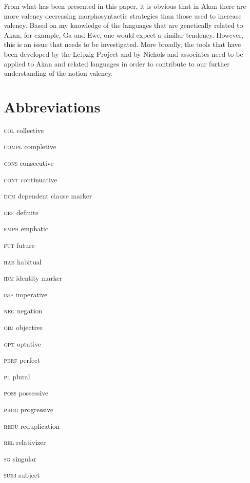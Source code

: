 \documentclass[output=paper]{langsci/langscibook}
\begin{document}
From what has been presented in this paper, it is obvious that in Akan there are more valency decreasing morphosyntactic strategies than those used to increase valency. Based on my knowledge of the languages that are genetically related to Akan, for example, Ga and Ewe, one would expect a similar tendency. However, this is an issue that needs to be investigated. More broadly, the tools that have been developed by the Leipzig Project and by Nichols and associates need to be applied to Akan and related languages in order to contribute to our further understanding of the notion valency.

\section*{Abbreviations}

\textsc{col}   collective

\textsc{compl}  completive

\textsc{cons}  consecutive

\textsc{cont}  continuative

\textsc{dcm}   dependent clause marker

\textsc{def}   definite

\textsc{emph}  emphatic

\textsc{fut}  future

\textsc{hab}  habitual

\textsc{idm}  identity marker

\textsc{imp}  imperative

\textsc{neg}  negation

\textsc{obj}  objective

\textsc{opt}  optative

\textsc{perf}  perfect

\textsc{pl}  plural

\textsc{poss}  possessive

\textsc{prog}  progressive

\textsc{redu}  reduplication

\textsc{rel} relativizer

\textsc{sg} singular

\textsc{subj} subject



{\sloppy
\printbibliography[heading=subbibliography,notkeyword=this]
}
\end{document}
